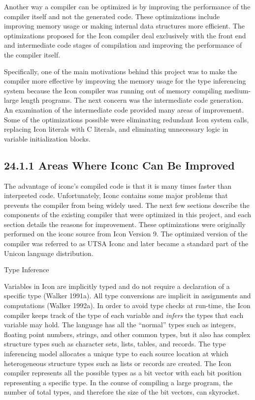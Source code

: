 Another way a compiler can be optimized is by improving the
performance of the compiler itself and not the generated code. These
optimizations include improving memory usage or making internal data
structures more efficient.  The optimizations proposed for the Icon
compiler deal exclusively with the front end and intermediate code
stages of compilation and improving the performance of the compiler
itself.

Specifically, one of the main motivations behind this project was to
make the compiler more effective by improving the memory usage for the
type inferencing system because the Icon compiler was running out of
memory compiling medium-large length programs. The next concern was
the intermediate code generation. An examination of the intermediate
code provided many areas of improvement. Some of the optimizations
possible were eliminating redundant Icon system calls, replacing Icon
literals with C literals, and eliminating unnecessary logic in
variable initialization blocks.

\subsection[24.1.1 Areas Where Iconc Can Be Improved]{24.1.1 Areas Where Iconc Can Be Improved}

The advantage of iconc's compiled code is that it is many times faster
than interpreted code. Unfortunately, Iconc contains some major
problems that prevents the compiler from being widely used. The next
few sections describe the components of the existing compiler that
were optimized in this project, and each section details the reasons
for improvement.  These optimizations were originally performed on the
iconc source from Icon Version 9. The optimized version of the
compiler was referred to as UTSA Iconc and later became a standard part
of the Unicon language distribution.

\bigskip

{\sffamily Type Inference}

Variables in Icon are implicitly typed and do not require a
declaration of a specific type (Walker 1991a). All type conversions
are implicit in assignments and computations (Walker 1992a). In
order to avoid type checks at run-time, the Icon compiler keeps track
of the type of each variable and \textit{infers} the types that each
variable may hold. The language has all the ``normal'' types such as
integers, floating point numbers, strings, and other common types, but
it also has complex structure types such as character sets, lists,
tables, and records. The type inferencing model allocates a unique
type to each source location at which heterogeneous structure types
such as lists or records are created. The Icon compiler represents all
the possible types as a bit vector with each bit position representing
a specific type. In the course of compiling a large program, the
number of total types, and therefore the size of the bit vectors, can
skyrocket.

